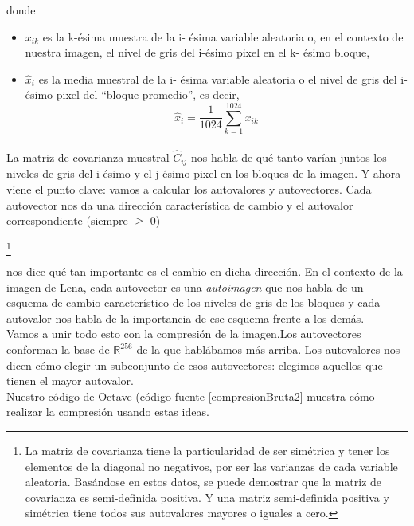 \documentclass[twocolumn,a4paper,10pt]{article}
\begin{document}
donde
\begin{itemize}
    \item $x_{ik}$ es la k-\'esima muestra de la i- \'esima variable aleatoria o, en el contexto de nuestra imagen, el nivel de gris del i-\'esimo pixel en el 
    k- \'esimo bloque,
    \item $\widehat{x}_{i}$ es la media muestral de la i- \'esima variable aleatoria o el nivel de gris del i-\'esimo pixel del “bloque promedio”, es decir,
    \[ \widehat{x}_{i} = \frac{1}{1024} \sum_{k=1}^{1024} x_{ik} \]
\end{itemize}

\paragraph*{}

La matriz de covarianza muestral $\widehat{C}_{ij}$ nos habla de qu\'e tanto var\'ian juntos los niveles de gris del i-\'esimo y el j-\'esimo pixel en los bloques 
de la imagen. Y ahora viene  el punto clave: vamos a calcular los autovalores y autovectores. Cada autovector nos da una direcci\'on caracter\'istica de cambio y 
el autovalor correspondiente  (siempre $\geq$ 0) 

\footnote{La matriz de covarianza tiene la particularidad de ser sim\'etrica y tener los elementos de la diagonal no negativos, por ser las 
varianzas de cada variable aleatoria. Bas\'andose en estos datos, se puede demostrar que la matriz de covarianza es semi-definida positiva. Y una matriz semi-definida 
positiva y sim\'etrica tiene todos sus autovalores mayores o iguales a cero.}

 nos dice qu\'e tan importante es el cambio en dicha direcci\'on. En el contexto de la imagen de Lena, cada autovector es una \textit{autoimagen}
que nos habla de un esquema de cambio caracter\'istico de los niveles de gris de los bloques y cada autovalor nos habla de la importancia de ese esquema frente 
a los dem\'as. \\

Vamos a unir todo esto con la compresi\'on de la imagen.Los autovectores conforman la base de $\mathbb{R}^{256}$ de la que habl\'abamos m\'as arriba. 
Los autovalores nos dicen c\'omo elegir un subconjunto de esos autovectores: elegimos aquellos que tienen el mayor autovalor. \\

Nuestro c\'odigo de Octave (c\'odigo fuente \ref{compresionBruta2} muestra c\'omo realizar la compresi\'on usando estas ideas. \\
\end{document}

